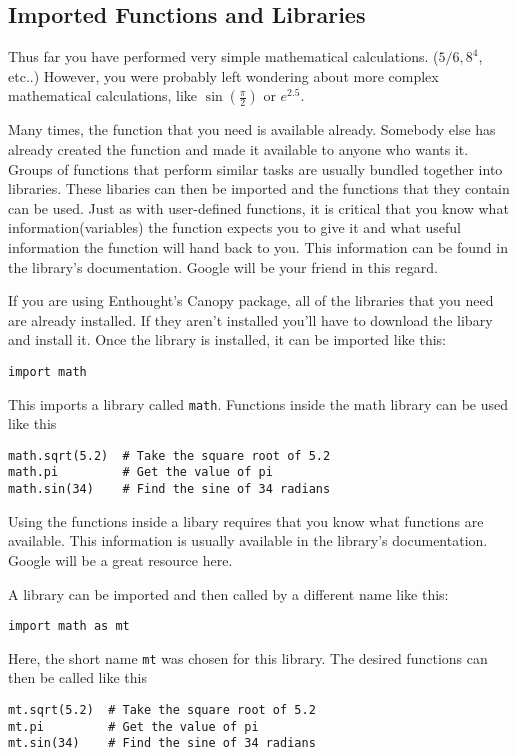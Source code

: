 \subsection*{Imported Functions and Libraries}
Thus far you have performed very simple mathematical
calculations. ($5/6, 8^4$, etc..)
However, you were probably left wondering about more complex
mathematical calculations, like $\sin(\frac{\pi}{2})$ or $e^{2.5}$.
 
Many times, the function that you need is available already. Somebody
else has already created the function and made it available to anyone
who wants it.  Groups of functions that perform similar tasks are usually
bundled together into libraries. These libaries can then be imported
and the functions that they contain can be used.  Just as with
user-defined functions, it is critical that you know what
information(variables) the function expects you to give it and what
useful information the function will hand back to you.  This
information can be found in the library's documentation.  Google will
be your friend in this regard.


If you are using Enthought's Canopy package, all of the
  libraries that you need are already installed.  If they aren't
  installed you'll have to download the libary and install it. Once
  the library is installed, it can be imported like this:
\begin{Verbatim}
import math
\end{Verbatim}
This imports a library called \texttt{math}.  Functions inside the
math library can be used like this
\begin{Verbatim}
math.sqrt(5.2)  # Take the square root of 5.2
math.pi         # Get the value of pi
math.sin(34)    # Find the sine of 34 radians
\end{Verbatim}
Using the functions inside a libary requires that you know what
functions are available.  This information is usually available in the
library's documentation.  Google will be a great resource here.

A library can be imported and then called by a different name like
this:
\begin{Verbatim}
import math as mt
\end{Verbatim}
Here, the short name \texttt{mt} was chosen for this library.
The desired functions can then be called like this
\begin{Verbatim}
mt.sqrt(5.2)  # Take the square root of 5.2
mt.pi         # Get the value of pi
mt.sin(34)    # Find the sine of 34 radians
\end{Verbatim}

